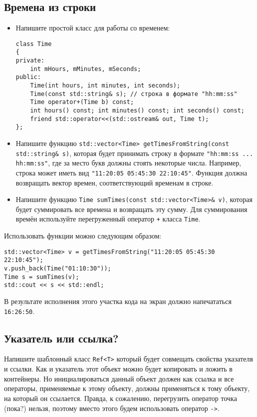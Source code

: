 \documentclass{article}
\begin{document}
\subsection{Времена из строки}
\begin{itemize}
\item Напишите простой класс для работы со временем:
\begin{lstlisting}
class Time 
{
private:
    int mHours, mMinutes, mSeconds;
public:
    Time(int hours, int minutes, int seconds);
    Time(const std::string& s); // строка в формате "hh:mm:ss"
    Time operator+(Time b) const;
    int hours() const; int minutes() const; int seconds() const;
    friend std::operator<<(std::ostream& out, Time t);
};
\end{lstlisting}
\item Напишите функцию \texttt{std::vector<Time> getTimesFromString(const std::string\& s)}, которая будет принимать строку в формате \texttt{"hh:mm:ss ... hh:mm:ss"}, где за место букв должны стоять некоторые числа. Например, строка может иметь вид \texttt{"11:20:05 05:45:30 22:10:45"}. Функция должна возвращать вектор времен, соответствующий временам в строке.
\item Напишите функцию \texttt{Time sumTimes(const std::vector<Time>\& v)}, которая будет суммировать все времена и возвращать эту сумму. Для суммирования времён используйте перегруженный оператор \texttt{+} класса \texttt{Time}.
\end{itemize}
Использовать функции можно следующим образом:
\begin{lstlisting}
std::vector<Time> v = getTimesFromString("11:20:05 05:45:30 22:10:45");
v.push_back(Time("01:10:30"));
Time s = sumTimes(v);
std::cout << s << std::endl;
\end{lstlisting}
В результате исполнения этого участка кода на экран должно напечататься \texttt{16:26:50}.



\subsection{Указатель или ссылка?}
Напишите шаблонный класс \texttt{Ref<T>} который будет совмещать свойства указателя и ссылки. Как и указатель этот объект можно будет копировать и ложить в контейнеры. Но инициалироваться данный объект должен как ссылка и все операторы, применяемые к этому объекту, должны применяться к тому объекту, на который он ссылается. Правда, к сожалению, перегрузить оператор точка (пока?) нельзя, поэтому вместо этого будем использовать оператор \texttt{->}.
\end{document}
